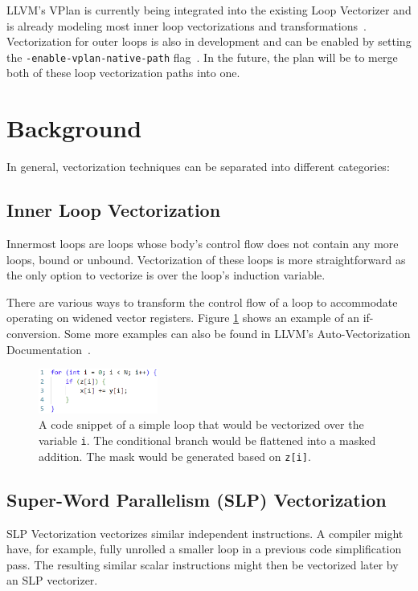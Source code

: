 \documentclass[sigplan,11pt,nonacm]{acmart}
\begin{document}
LLVM's VPlan is currently being integrated into the existing Loop Vectorizer and is
already modeling most inner loop vectorizations and transformations~\cite{llvmvplanupdate}. 
Vectorization for outer loops is also in development and can be enabled by setting 
the \texttt{-enable-vplan-native-path} flag~\cite{llvmouterloop}. In the future, the plan will 
be to merge both of these loop vectorization paths into one.




\section{Background}
\label{sec:background}
In general, vectorization techniques can be separated into different categories:

\subsection{Inner Loop Vectorization}
Innermost loops are loops whose body's control flow does not contain any more loops, bound or unbound.
Vectorization of these loops is more straightforward as the only option to vectorize is over 
the loop's induction variable.

There are various ways to transform the control flow of a loop to accommodate operating on widened
vector registers. Figure \ref{fig:inner-loop-vec} shows an example of an if-conversion. Some more
examples can also be found in LLVM's Auto-Vectorization Documentation~\cite{llvmvec}.

\begin{figure}
  \centering
  \includegraphics[width=0.35\textwidth]{images/inner-loop-vec.png}
  \caption{A code snippet of a simple loop that would be vectorized over the variable \texttt{i}. 
  The conditional branch would be flattened into a masked addition. The mask would be generated 
  based on \texttt{z[i]}.}
  \label{fig:inner-loop-vec}
\end{figure}

\subsection{Super-Word Parallelism (SLP) Vectorization}
SLP Vectorization vectorizes similar independent instructions. A compiler might have, for example, 
fully unrolled a smaller loop in a previous code simplification pass. The resulting similar scalar 
instructions might then be vectorized later by an SLP vectorizer.
\end{document}
